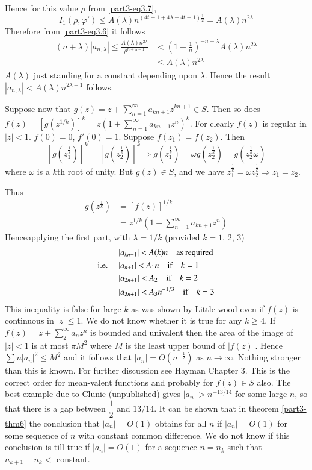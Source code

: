 Hence for this value $\rho$ from \eqref{part3-eq3.7},
$$
I_{1}(\rho,\varphi')\leq
A(\lambda)n^{(4t+1+4\lambda-4t-1)\frac{1}{2}}=A(\lambda)n^{2\lambda}
$$
Therefore from \eqref{part3-eq3.6} it follows
\begin{align*}
(n+\lambda)|a_{n,\lambda}|\leq
  \frac{A(\lambda)n^{2\lambda}}{\rho^{n+\lambda-1}} &<
  \left(1-\frac{1}{n}\right)^{-n-\lambda}A(\lambda)n^{2\lambda}\\
&\leq A(\lambda)n^{2\lambda}
\end{align*}
$A(\lambda)$ just standing for a constant depending upon
$\lambda$. Hence the result $|a_{n,\lambda}|<A(\lambda)n^{2\lambda-1}$
follows.

Suppose now that $g(z)=z+\sum\limits^{\infty}_{n=1}a_{kn+1}z^{kn+1}\in
S$. Then so does
$f(z)=[g(z^{1/k})]^{k}=z\left(1+\sum\limits^{\infty}_{n=1}
a_{kn+1}z^{n}\right)^{k}$. For 
clearly $f(z)$ is regular in $|z|<1$. $f(0)=0$, $f'(0)=1$. Suppose
$f(z_{1})=f(z_{2})$. Then
$$
\left[g\left(z_{1}^{\frac{1}{k}}\right)\right]^{k}=\left[g\left(z^{\frac{1}{k}}_{2}\right)\right]^{k}\Longrightarrow
g\left(z_{1}^{\frac{1}{k}}\right)=\omega
g\left(z^{\frac{1}{k}}_{2}\right)=g\left(z^{\frac{1}{k}}_{2}\omega\right) 
$$
where $\omega$ is a $k$th root of unity. But $g(z)\in S$, and we have
$z^{\frac{1}{k}}_{1}=\omega z^{\frac{1}{k}}_{2}\Longrightarrow
z_{1}=z_{2}$.

Thus
\begin{align*}
g\left(z^{\frac{1}{k}}\right) &= [f(z)]^{1/k}\\
                             &=
z^{1/k}\left(1+\sum^{\infty}_{n=1}a_{kn+1}z^{n}\right) 
\end{align*}
Hence\pageoriginale applying the first part, with $\lambda=1/k$
(provided $k=1$, $2$, $3$)
\begin{align*}
& |a_{kn+1}|<A(k)n\quad\text{as required}\\
\text{{i.e.}\kern.3em}\quad & |a_{n+1}|<A_{1}n \quad\text{if}\quad k=1\\
&|a_{2n+1}|<A_{2}\quad\text{if}\quad k=2\\
&|a_{3n+1}|<A_{3}n^{-1/3}\quad\text{if}\quad k=3
\end{align*}
This inequality is false for large $k$ as was shown by Little wood
\cite{1} even if $f(z)$ is continuous in $|z|\leq 1$. We do not know
whether it is true for any $k\geq 4$. If
$f(z)=z+\sum\limits^{\infty}_{2}a_{n}z^{n}$ is bounded and univalent
then the area of the image of $|z|<1$ is at most $\pi M^{2}$ where $M$
is the least upper bound of $|f(z)|$. Hence $\sum n|a_{n}|^{2}\leq M^{2}$
  and it follows that $|a_{n}|=O(n^{-\frac{1}{2}})$ as $n\to
  \infty$. Nothing stronger than this is known. For further discussion
  see Hayman Chapter 3. This is the correct order for mean-valent
  functions and probably for $f(z)\in S$ also. The best example
  due to Clunie (unpublished) gives $|a_{n}|>n^{-13/14}$ for some
  large $n$, so that there is a gap between $\dfrac{1}{2}$ and
  $13/14$. It can be shown that in theorem \ref{part3-thm6} the
  conclusion that $|a_{n}|=O(1)$ obtains for all $n$ if $|a_{n}|=O(1)$
  for some sequence of $n$ with constant common difference. We do not
  know if this conclusion is till true \ie if $|a_{n}|=O(1)$ for a
  sequence $n=n_{k}$ such that $n_{k+1}-n_{k}<$ constant.

